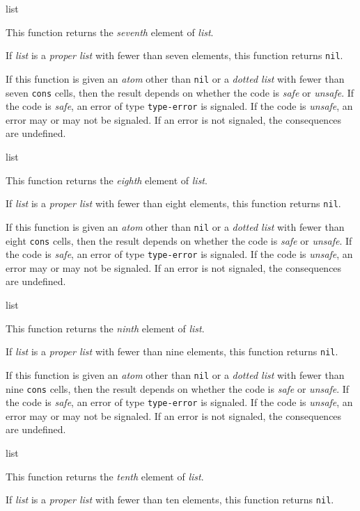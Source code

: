  {list}

This function returns the \emph{seventh} element of \textit{list}.

If \textit{list} is a \emph{proper list} with fewer than seven
elements, this function returns \texttt{nil}.

If this function is given an \emph{atom} other than \texttt{nil} or a
\emph{dotted list} with fewer than seven \texttt{cons} cells, then the
result depends on whether the code is \emph{safe} or \emph{unsafe}.
If the code is \emph{safe}, an error of type \texttt{type-error} is
signaled.  If the code is \emph{unsafe}, an error may or may not be
signaled.  If an error is not signaled, the consequences are
undefined.

 {list}

This function returns the \emph{eighth} element of \textit{list}.

If \textit{list} is a \emph{proper list} with fewer than eight
elements, this function returns \texttt{nil}.

If this function is given an \emph{atom} other than \texttt{nil} or a
\emph{dotted list} with fewer than eight \texttt{cons} cells, then the
result depends on whether the code is \emph{safe} or \emph{unsafe}.
If the code is \emph{safe}, an error of type \texttt{type-error} is
signaled.  If the code is \emph{unsafe}, an error may or may not be
signaled.  If an error is not signaled, the consequences are
undefined.


 {list}

This function returns the \emph{ninth} element of \textit{list}.

If \textit{list} is a \emph{proper list} with fewer than nine
elements, this function returns \texttt{nil}.

If this function is given an \emph{atom} other than \texttt{nil} or a
\emph{dotted list} with fewer than nine \texttt{cons} cells, then the
result depends on whether the code is \emph{safe} or \emph{unsafe}.
If the code is \emph{safe}, an error of type \texttt{type-error} is
signaled.  If the code is \emph{unsafe}, an error may or may not be
signaled.  If an error is not signaled, the consequences are
undefined.

 {list}

This function returns the \emph{tenth} element of \textit{list}.

If \textit{list} is a \emph{proper list} with fewer than ten
elements, this function returns \texttt{nil}.

